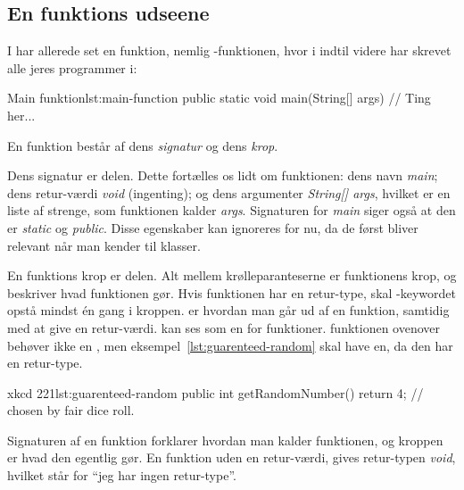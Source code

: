 
	\subsection{En funktions udseene}

		I har allerede set en funktion, nemlig -funktionen, hvor i
		indtil videre har skrevet alle jeres programmer i:

		\begin{JavaCode}{Main funktion}{lst:main-function}
			public static void main(String[] args) {
				// Ting her...
			}
		\end{JavaCode}

		En funktion består af dens \emph{signatur} og dens \emph{krop}.

        Dens signatur er 
        delen.  Dette fortælles os lidt om funktionen: dens
        navn \emph{main}; dens retur-værdi \emph{void} (ingenting); og
        dens argumenter \emph{String[] args}, hvilket er en liste af
        strenge, som funktionen kalder \emph{args}.  Signaturen for
        \emph{main} siger også at den er \emph{static} og
        \emph{public}. Disse egenskaber kan ignoreres for nu, da de
        først bliver relevant når man kender til klasser.

        En funktions krop er  delen. Alt
        mellem krølleparanteserne er funktionens krop, og beskriver
        hvad funktionen gør.  Hvis funktionen har en retur-type, skal
        -keywordet opstå mindst én gang i kroppen.
         er hvordan man går ud af en funktion,
        samtidig med at give en retur-værdi.   kan
        ses som en  for funktioner.
         funktionen ovenover behøver ikke en
        , men eksempel~\ref{lst:guarenteed-random}
        skal have en, da den har en retur-type.

		\begin{JavaCode}{xkcd 221}{lst:guarenteed-random}
			public int getRandomNumber() {
				return 4;  // chosen by fair dice roll.
			}
		\end{JavaCode}

        Signaturen af en funktion forklarer hvordan man kalder
        funktionen, og kroppen er hvad den egentlig gør.
        En funktion uden en retur-værdi, gives retur-typen
        \emph{void}, hvilket står for ``jeg har ingen retur-type''.

